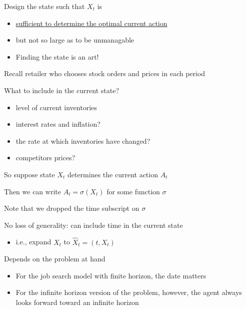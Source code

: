 \begin{frame}

     Design the state such that $X_t$ is
    \begin{itemize}
        \item \underline{sufficient to determine the optimal current action}
        \item but not so large as to be unmanagable
    \end{itemize}

    \begin{itemize}
        \item Finding the state is an art!
    \end{itemize}
    
    \Eg Recall retailer who chooses stock orders and prices in each period

    What to include in the current state?

    \begin{itemize}
        \item level of current inventories 
        \item interest rates and inflation?
        \item the rate at which inventories have changed?
        \item competitors prices?
    \end{itemize}

\end{frame}



\begin{frame}
    
    So suppose state $X_t$ determines the current action $A_t$

    Then we can write $A_t = \sigma(X_t)$ for some function $\sigma$

    Note that we dropped the time subscript on $\sigma$

    No loss of generality: can include time in the current state 
    \begin{itemize}
        \item i.e., expand $X_t$ to $\hat X_t = (t, X_t)$
    \end{itemize}

    Depends on the problem at hand
    \begin{itemize}
        \item For the job search model with finite horizon, the date matters
        \item For the infinite horizon version of the problem, however, the
            agent always looks forward toward an infinite horizon
    \end{itemize}

\end{frame}


